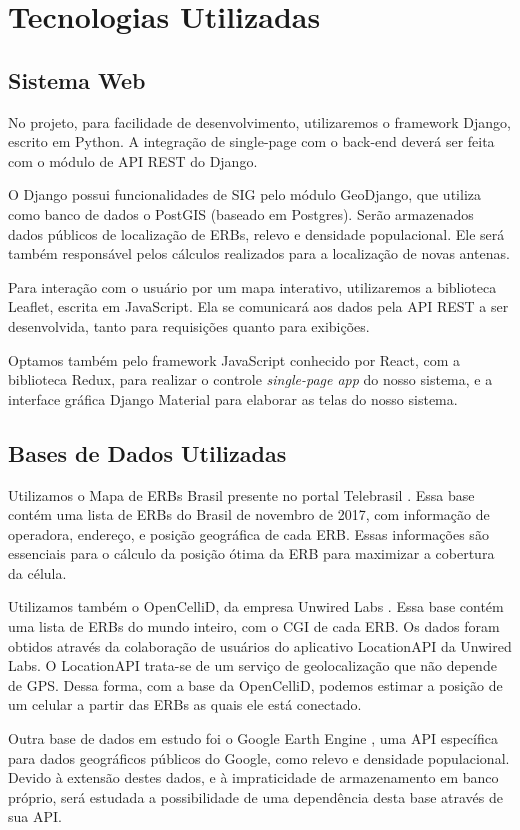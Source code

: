 \documentclass[]{politex}
\begin{document}
\chapter{Tecnologias Utilizadas}

\section{Sistema Web}
No projeto, para facilidade de desenvolvimento, utilizaremos o framework Django,
escrito em Python. A integração de single-page com o back-end deverá ser feita
com o módulo de API REST do Django.

O Django possui funcionalidades de SIG pelo módulo GeoDjango, que utiliza como
banco de dados o PostGIS (baseado em Postgres). Serão armazenados
dados públicos de localização de ERBs, relevo e densidade populacional. Ele
será também responsável pelos cálculos realizados para a localização de novas
antenas.

Para interação com o usuário por um mapa interativo, utilizaremos a biblioteca
Leaflet, escrita em JavaScript. Ela se comunicará aos dados pela API REST a ser
desenvolvida, tanto para requisições quanto para exibições.

Optamos também pelo framework JavaScript conhecido por React, com a biblioteca
Redux, para realizar o controle \emph{single-page app} do nosso sistema, e a
interface gráfica Django Material para elaborar as telas do nosso sistema.

\section{Bases de Dados Utilizadas}
Utilizamos o Mapa de ERBs Brasil presente no portal Telebrasil \cite{mapa-erb}.
Essa base contém uma lista de ERBs do Brasil de novembro de 2017, com
informação de operadora, endereço, e posição geográfica de cada ERB.
Essas informações são essenciais para o cálculo da posição ótima da ERB para
maximizar a cobertura da célula.

Utilizamos também o OpenCelliD, da empresa Unwired Labs \cite{opencellid}.
Essa base contém uma lista de ERBs do mundo inteiro, com o CGI de cada ERB.
Os dados foram obtidos através da colaboração de usuários do aplicativo
LocationAPI da Unwired Labs. O LocationAPI trata-se de um serviço de
geolocalização que não depende de GPS. Dessa forma, com a base da OpenCelliD,
podemos estimar a posição de um celular a partir das ERBs as quais ele está
conectado.

Outra base de dados em estudo foi o Google Earth Engine \cite{earthengine}, uma
API específica para dados geográficos públicos do Google, como relevo e
densidade populacional. Devido à extensão destes dados, e à impraticidade de
armazenamento em banco próprio, será estudada a possibilidade de uma dependência
desta base através de sua API.
\end{document}
